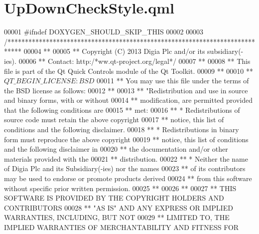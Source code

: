 \hypertarget{UpDownCheckStyle_8qml}{\section{Up\-Down\-Check\-Style.\-qml}
\label{UpDownCheckStyle_8qml}
}

\begin{DoxyCode}
00001 \textcolor{preprocessor}{#ifndef DOXYGEN\_SHOULD\_SKIP\_THIS}
00002 \textcolor{preprocessor}{}
00003 \textcolor{comment}{/****************************************************************************}
00004 \textcolor{comment}{**}
00005 \textcolor{comment}{** Copyright (C) 2013 Digia Plc and/or its subsidiary(-ies).}
00006 \textcolor{comment}{** Contact: http:/*ww.qt-project.org/legal*/}
00007 **
00008 ** This file is part of the Qt Quick Controls module of the Qt Toolkit.
00009 **
00010 ** $QT\_BEGIN\_LICENSE:BSD$
00011 ** You may use \textcolor{keyword}{this} file under the terms of the BSD license as follows:
00012 **
00013 ** \textcolor{stringliteral}{"Redistribution and use in source and binary forms, with or without}
00014 \textcolor{stringliteral}{** modification, are permitted provided that the following conditions are}
00015 \textcolor{stringliteral}{** met:}
00016 \textcolor{stringliteral}{**   * Redistributions of source code must retain the above copyright}
00017 \textcolor{stringliteral}{**     notice, this list of conditions and the following disclaimer.}
00018 \textcolor{stringliteral}{**   * Redistributions in binary form must reproduce the above copyright}
00019 \textcolor{stringliteral}{**     notice, this list of conditions and the following disclaimer in}
00020 \textcolor{stringliteral}{**     the documentation and/or other materials provided with the}
00021 \textcolor{stringliteral}{**     distribution.}
00022 \textcolor{stringliteral}{**   * Neither the name of Digia Plc and its Subsidiary(-ies) nor the names}
00023 \textcolor{stringliteral}{**     of its contributors may be used to endorse or promote products derived}
00024 \textcolor{stringliteral}{**     from this software without specific prior written permission.}
00025 \textcolor{stringliteral}{**}
00026 \textcolor{stringliteral}{**}
00027 \textcolor{stringliteral}{** THIS SOFTWARE IS PROVIDED BY THE COPYRIGHT HOLDERS AND CONTRIBUTORS}
00028 \textcolor{stringliteral}{** "}AS IS\textcolor{stringliteral}{" AND ANY EXPRESS OR IMPLIED WARRANTIES, INCLUDING, BUT NOT}
00029 \textcolor{stringliteral}{** LIMITED TO, THE IMPLIED WARRANTIES OF MERCHANTABILITY AND FITNESS FOR}

\end{DoxyCode}

